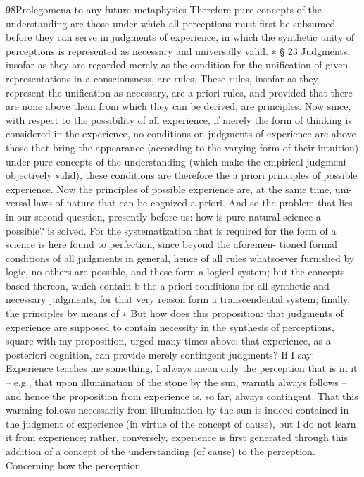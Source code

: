 98Prolegomena to any future metaphysics
Therefore pure concepts of the understanding are those under which all
perceptions must ﬁrst be subsumed before they can serve in judgments
of experience, in which the synthetic unity of perceptions is represented
as necessary and universally valid. ∗
§ 23
Judgments, insofar as they are regarded merely as the condition for the
uniﬁcation of given representations in a consciousness, are rules. These
rules, insofar as they represent the uniﬁcation as necessary, are a priori
rules, and provided that there are none above them from which they can
be derived, are principles. Now since, with respect to the possibility of all
experience, if merely the form of thinking is considered in the experience,
no conditions on judgments of experience are above those that bring
the appearance (according to the varying form of their intuition) under
pure concepts of the understanding (which make the empirical judgment
objectively valid), these conditions are therefore the a priori principles
of possible experience.
Now the principles of possible experience are, at the same time, uni-
versal laws of nature that can be cognized a priori. And so the problem
that lies in our second question, presently before us: how is pure natural
science a possible? is solved. For the systematization that is required for the
form of a science is here found to perfection, since beyond the aforemen-
tioned formal conditions of all judgments in general, hence of all rules
whatsoever furnished by logic, no others are possible, and these form
a logical system; but the concepts based thereon, which contain b the a
priori conditions for all synthetic and necessary judgments, for that very
reason form a transcendental system; ﬁnally, the principles by means of
∗ But how does this proposition: that judgments of experience are supposed to
contain necessity in the synthesis of perceptions, square with my proposition,
urged many times above: that experience, as a posteriori cognition, can provide
merely contingent judgments? If I say: Experience teaches me something, I
always mean only the perception that is in it – e.g., that upon illumination of
the stone by the sun, warmth always follows – and hence the proposition from
experience is, so far, always contingent. That this warming follows necessarily
from illumination by the sun is indeed contained in the judgment of experience
(in virtue of the concept of cause), but I do not learn it from experience; rather,
conversely, experience is ﬁrst generated through this addition of a concept of
the understanding (of cause) to the perception. Concerning how the perception
